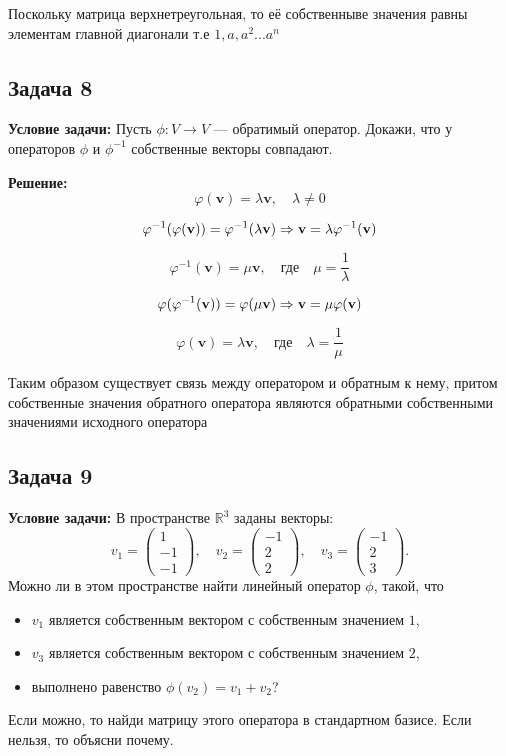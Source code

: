\documentclass[a4paper,12pt]{article}
\begin{document}
Поскольку матрица верхнетреугольная, то её собственныве значения равны элементам главной диагонали т.е $1, a, a^2...a^n$

\subsection{Задача 8}
\textbf{Условие задачи:} Пусть $\phi: V \to V$ — обратимый оператор. Докажи, что у операторов $\phi$ и $\phi^{-1}$ собственные векторы совпадают.

\textbf{Решение: }
\[
\varphi(\mathbf{v}) = \lambda \mathbf{v}, \quad \lambda \neq 0
\]

\[
\varphi^{-1}(\varphi(\mathbf{v})) = \varphi^{-1}(\lambda \mathbf{v}) \\
\Rightarrow \mathbf{v} = \lambda \varphi^{-1}(\mathbf{v})
\]

\[
\varphi^{-1}(\mathbf{v}) = \mu \mathbf{v}, \quad \text{где} \quad \mu = \frac{1}{\lambda}
\]

\[
\varphi(\varphi^{-1}(\mathbf{v})) = \varphi(\mu \mathbf{v}) \\
\Rightarrow \mathbf{v} = \mu \varphi(\mathbf{v})
\]

\[
\varphi(\mathbf{v}) = \lambda \mathbf{v}, \quad \text{где} \quad \lambda = \frac{1}{\mu}
\]

Таким образом существует связь между оператором и обратным к нему, притом собственные значения обратного оператора являются обратными собственными значениями исходного оператора

\subsection{Задача 9}
\textbf{Условие задачи:} В пространстве $\mathbb{R}^3$ заданы векторы:
\[
v_1 =
\begin{pmatrix}
1 \\
-1 \\
-1
\end{pmatrix}, \quad
v_2 =
\begin{pmatrix}
-1 \\
2 \\
2
\end{pmatrix}, \quad
v_3 =
\begin{pmatrix}
-1 \\
2 \\
3
\end{pmatrix}.
\]
Можно ли в этом пространстве найти линейный оператор $\phi$, такой, что
\begin{itemize}
    \item $v_1$ является собственным вектором с собственным значением $1$,
    \item $v_3$ является собственным вектором с собственным значением $2$,
    \item выполнено равенство $\phi(v_2) = v_1 + v_2$?
\end{itemize}
Если можно, то найди матрицу этого оператора в стандартном базисе. Если нельзя, то объясни почему.
\end{document}
